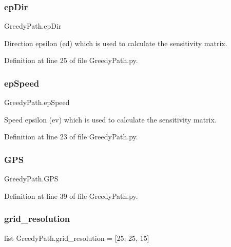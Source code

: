 \subsubsection{\texorpdfstring{ep\+Dir}{epDir}}
{\footnotesize\ttfamily Greedy\+Path.\+ep\+Dir}



Direction epsilon (ed) which is used to calculate the sensitivity matrix. 



Definition at line 25 of file Greedy\+Path.\+py.

\mbox{\label{namespace_greedy_path_a5d30db54ed4660997cad7a99db0ae3d5}} 
\subsubsection{\texorpdfstring{ep\+Speed}{epSpeed}}
{\footnotesize\ttfamily Greedy\+Path.\+ep\+Speed}



Speed epsilon (ev) which is used to calculate the sensitivity matrix. 



Definition at line 23 of file Greedy\+Path.\+py.

\mbox{\label{namespace_greedy_path_a789d06703c87f9f5dca025c8695a1857}} 
\subsubsection{\texorpdfstring{G\+PS}{GPS}}
{\footnotesize\ttfamily Greedy\+Path.\+G\+PS}



Definition at line 39 of file Greedy\+Path.\+py.

\mbox{\label{namespace_greedy_path_a1d2a41e131ea92ec827544055660645d}} 
\subsubsection{\texorpdfstring{grid\+\_\+resolution}{grid\_resolution}}
{\footnotesize\ttfamily list Greedy\+Path.\+grid\+\_\+resolution = \mbox{[}25, 25, 15\mbox{]}}



